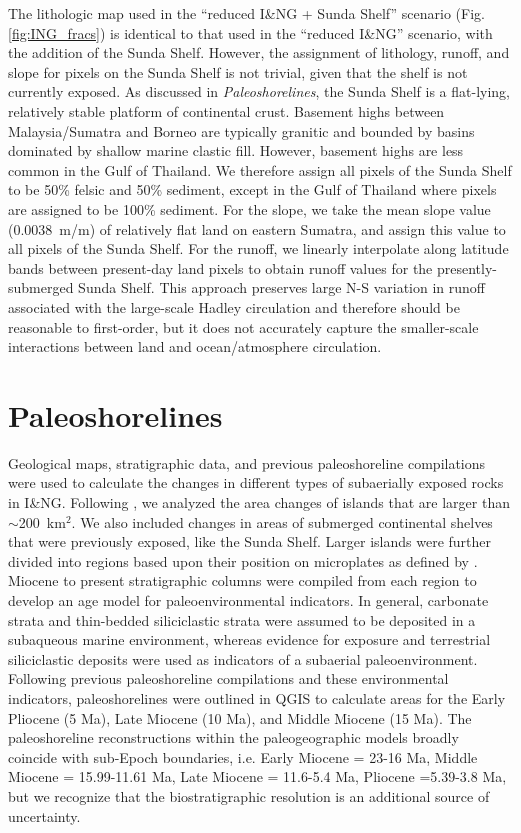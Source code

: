 \documentclass[11pt,letterpaper]{article}
\begin{document}
The lithologic map used in the ``reduced I\&NG + Sunda Shelf'' scenario (Fig. \ref{fig:ING_fracs}) is identical to that used in the ``reduced I\&NG'' scenario, with the addition of the Sunda Shelf. However, the assignment of lithology, runoff, and slope for pixels on the Sunda Shelf is not trivial, given that the shelf is not currently exposed. As discussed in \textit{Paleoshorelines}, the Sunda Shelf is a flat-lying, relatively stable platform of continental crust. Basement highs between Malaysia/Sumatra and Borneo are typically granitic and bounded by basins dominated by shallow marine clastic fill. However, basement highs are less common in the Gulf of Thailand. We therefore assign all pixels of the Sunda Shelf to be 50\% felsic and 50\% sediment, except in the Gulf of Thailand where pixels are assigned to be 100\% sediment. For the slope, we take the mean slope value (0.0038~m/m) of relatively flat land on eastern Sumatra, and assign this value to all pixels of the Sunda Shelf.  For the runoff, we linearly interpolate along latitude bands between present-day land pixels to obtain runoff values for the presently-submerged Sunda Shelf. This approach preserves large N-S variation in runoff associated with the large-scale Hadley circulation and therefore should be reasonable to first-order, but it does not accurately capture the smaller-scale interactions between land and ocean/atmosphere circulation.

\section*{Paleoshorelines}

Geological maps, stratigraphic data, and previous paleoshoreline compilations were used to calculate the changes in different types of subaerially exposed rocks in I\&NG. Following \citet{Molnar2015a}, we analyzed the area changes of islands that are larger than $\sim$200~km$^{2}$. We also included changes in areas of submerged continental shelves that were previously exposed, like the Sunda Shelf. Larger islands were further divided into regions based upon their position on microplates as defined by \citep{Matthews2016a}. Miocene to present stratigraphic columns were compiled from each region to develop an age model for paleoenvironmental indicators. In general, carbonate strata and thin-bedded siliciclastic strata were assumed to be deposited in a subaqueous marine environment, whereas evidence for exposure and terrestrial siliciclastic deposits were used as indicators of a subaerial paleoenvironment. Following previous paleoshoreline compilations and these environmental indicators, paleoshorelines were outlined in QGIS to calculate areas for the Early Pliocene (5 Ma), Late Miocene (10 Ma), and Middle Miocene (15 Ma). The paleoshoreline reconstructions within the paleogeographic models broadly coincide with sub-Epoch boundaries, i.e. Early Miocene = 23-16 Ma, Middle Miocene = 15.99-11.61 Ma, Late Miocene = 11.6-5.4 Ma, Pliocene =5.39-3.8 Ma, but we recognize that the biostratigraphic resolution is an additional source of uncertainty.
\end{document}

